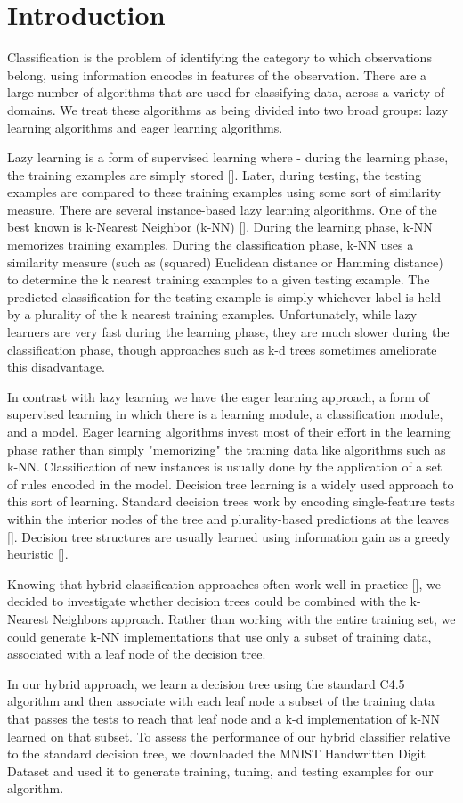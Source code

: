 \section{Introduction}
Classification is the problem of identifying the category to which observations belong, using information encodes in features of the observation. There are a large number of algorithms that are used for classifying data, across a variety of domains.  We treat these algorithms as being divided into two broad groups: lazy learning algorithms and eager learning algorithms.

  Lazy learning is a form of supervised learning where - during the learning phase, the training examples are simply stored [].  Later, during testing, the testing examples are compared to these training examples using some sort of similarity measure.  There are several instance-based lazy learning algorithms. One of the best known is k-Nearest Neighbor (k-NN) []. During the learning phase, k-NN memorizes training examples. During the classification phase, k-NN uses a similarity measure (such as (squared) Euclidean distance or Hamming distance) to determine the k nearest training examples to a given testing example.  The predicted classification for the testing example is simply whichever label is held by a plurality of the k nearest training examples.  Unfortunately, while lazy learners are very fast during the learning phase, they are much slower during the classification phase, though approaches such as k-d trees sometimes ameliorate this disadvantage.
  
   In contrast with lazy learning we have the eager learning approach, a form of supervised learning in which there is a learning module, a classification module, and a model. Eager learning algorithms invest most of their effort in the learning phase rather than simply "memorizing" the training data like algorithms such as k-NN. Classification of new instances is usually done by the application of a set of rules encoded in the model. Decision tree learning is a widely used approach to this sort of learning. Standard decision trees work by encoding single-feature tests within the interior nodes of the tree and plurality-based predictions at the leaves [].  Decision tree structures are usually learned using information gain as a greedy heuristic [].
   
  Knowing that hybrid classification approaches often work well in practice [], we decided to investigate whether decision trees could be combined with the k-Nearest Neighbors approach.  Rather than working with the entire training set, we could generate k-NN implementations that use only a subset of training data, associated with a leaf node of the decision tree.

  In our hybrid approach, we learn a decision tree using the standard C4.5 algorithm and then associate with each leaf node a subset of the training data that passes the tests to reach that leaf node and a k-d implementation of k-NN learned on that subset. To assess the performance of our hybrid classifier relative to the standard decision tree, we downloaded the MNIST Handwritten Digit Dataset \cite{MNISTDatabase} and used it to generate training, tuning, and testing examples for our algorithm.
